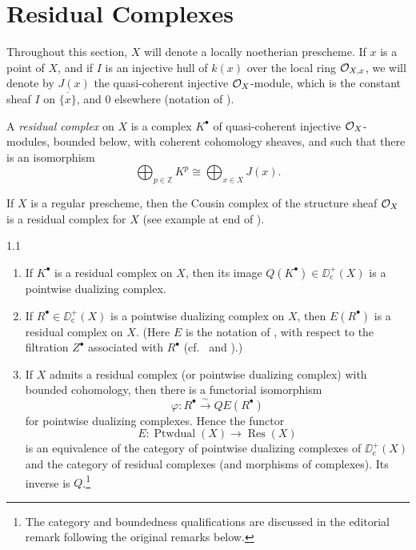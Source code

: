 \section{Residual Complexes}\label{sec:6.1}

Throughout this section, $X$ will denote a locally noetherian prescheme. If $x$ is a point of $X$, and if $I$ is an injective hull of $k(x)$ over the local ring $\mathcal{O}_{X,x}$, we will denote by $J(x)$ the quasi-coherent injective $\mathcal{O}_X$-module, which is the constant sheaf $I$ on $\overline{\{x\}}$, and $0$ elsewhere (notation of ).

\begin{definition*}
A \emph{residual complex} on $X$ is a complex $K^\bullet$ of quasi-coherent injective $\mathcal{O}_X$-modules, bounded below, with coherent cohomology sheaves, and such that there is an isomorphism
\[
\bigoplus_{p\in\mathbb{Z}} K^{p} \cong \bigoplus_{x\in X} J(x).
\]
\end{definition*}

\begin{example*}
If $X$ is a regular prescheme, then the Cousin complex of the structure sheaf $\mathcal{O}_X$ is a residual complex for $X$ (see example at end of ).
\end{example*}

\begin{bookproposition}{1.1}\label{prop:6.1.1}
\begin{enumerate}
\item[a)] If $K^\bullet$ is a residual complex on $X$, then its image $Q(K^\bullet)\in\DD^+_{\mathrm{c}}(X)$ is a pointwise dualizing complex.
\item[b)] If $R^\bullet\in\DD^+_{\mathrm{c}}(X)$ is a pointwise dualizing complex on $X$, then $E(R^\bullet)$ is a residual complex on $X$. (Here $E$ is the notation of , with respect to the filtration $Z^\bullet$ associated with $R^\bullet$ (cf.\  and ).)
\item[c)] If $X$ admits a residual complex (or pointwise dualizing complex) with bounded cohomology, then there is a functorial isomorphism
\[
\varphi\colon R^{\bullet}\xrightarrow{\sim} QE(R^{\bullet})
\]
for pointwise dualizing complexes. Hence the functor
\[
E\colon \operatorname{Ptwdual}(X)\longrightarrow \operatorname{Res}(X)
\]
is an equivalence of the category of pointwise dualizing complexes of $\DD_{\mathrm{c}}^{+}(X)$ and the category of residual complexes (and morphisms of complexes). Its inverse is $Q$.\footnote{The category and boundedness qualifications are discussed in the editorial remark following the original remarks below.}
\end{enumerate}
\end{bookproposition}

